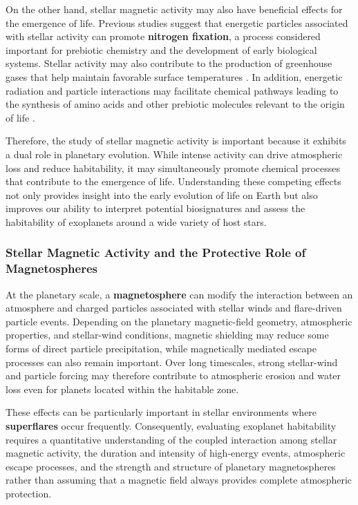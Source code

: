 On the other hand, stellar magnetic activity may also have beneficial effects for the emergence of life. Previous studies suggest that energetic particles associated with stellar activity can promote \textbf{nitrogen fixation}, a process considered important for prebiotic chemistry and the development of early biological systems. Stellar activity may also contribute to the production of greenhouse gases that help maintain favorable surface temperatures \cite{airapetian2016}. In addition, energetic radiation and particle interactions may facilitate chemical pathways leading to the synthesis of amino acids and other prebiotic molecules relevant to the origin of life \cite{kobayashi2023}.

Therefore, the study of stellar magnetic activity is important because it exhibits a dual role in planetary evolution. While intense activity can drive atmospheric loss and reduce habitability, it may simultaneously promote chemical processes that contribute to the emergence of life. Understanding these competing effects not only provides insight into the early evolution of life on Earth but also improves our ability to interpret potential biosignatures and assess the habitability of exoplanets around a wide variety of host stars.

\subsubsection{Stellar Magnetic Activity and the Protective Role of Magnetospheres}

At the planetary scale, a \textbf{magnetosphere} can modify the interaction between an atmosphere and charged particles associated with stellar winds and flare-driven particle events. Depending on the planetary magnetic-field geometry, atmospheric properties, and stellar-wind conditions, magnetic shielding may reduce some forms of direct particle precipitation, while magnetically mediated escape processes can also remain important. Over long timescales, strong stellar-wind and particle forcing may therefore contribute to atmospheric erosion and water loss even for planets located within the habitable zone.

These effects can be particularly important in stellar environments where \textbf{superflares} occur frequently. Consequently, evaluating exoplanet habitability requires a quantitative understanding of the coupled interaction among stellar magnetic activity, the duration and intensity of high-energy events, atmospheric escape processes, and the strength and structure of planetary magnetospheres rather than assuming that a magnetic field always provides complete atmospheric protection.


